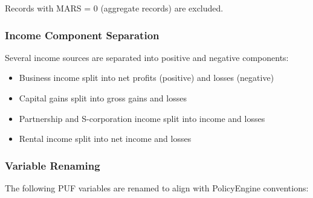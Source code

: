 Records with MARS = 0 (aggregate records) are excluded.

\subsubsection{Income Component Separation}

Several income sources are separated into positive and negative components:

\begin{itemize}
    \item Business income split into net profits (positive) and losses (negative)
    \item Capital gains split into gross gains and losses
    \item Partnership and S-corporation income split into income and losses
    \item Rental income split into net income and losses
\end{itemize}

\subsubsection{Variable Renaming}

The following PUF variables are renamed to align with PolicyEngine conventions:

